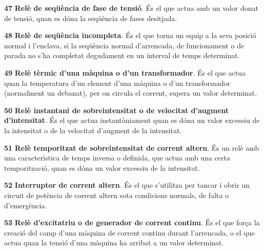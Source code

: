\begin{multicols}{2}
\begin{list}{}
\item[\textbf{47}]  \textbf{Rel\`{e}
de seq\"{u}\`{e}ncia de fase de tensi\'{o}}. \'{E}s el que actua amb un valor donat
de tensi\'{o}, quan es d\'{o}na la seq\"{u}\`{e}ncia de fases desitjada.

\item[\textbf{48}]  \textbf{Rel\`{e} de seq\"{u}\`{e}ncia
incompleta}. \'{E}s el que torna un equip a la seva posici\'{o} normal  i
l'enclava, si la seq\"{u}\`{e}ncia normal d'arrencada, de funcionament o de
parada no s'ha completat degudament en un interval de temps
determinat.

\item[\textbf{49}] 
\textbf{Rel\`{e} t\`{e}rmic d'una m\`{a}quina o d'un transformador}. \'{E}s el que
actua quan la temperatura d'un element d'una m\`{a}quina o d'un
transformador (normalment un debanat), per on circula el corrent,
supera un valor determinat.

\item[\textbf{50}]  \textbf{Rel\`{e} instantani de sobreintensitat o de velocitat d'augment
d'intensitat}. \'{E}s el que actua instant\`{a}niament quan es d\'{o}na un valor excessiu de la
intensitat o de la  velocitat d'augment de la intensitat.

\item[\textbf{51}] 
\textbf{Rel\`{e} temporitzat de sobreintensitat de corrent altern}. \'{E}s
un rel\`{e} amb una caracter\'{\i}stica de temps inversa o definida, que
actua amb una certa temporitzaci\'{o}, quan es d\'{o}na un valor excessiu de
la intensitat.

\item[\textbf{52}]  \textbf{Interruptor de corrent altern}. \'{E}s
 el que s'utilitza per tancar i obrir un circuit de pot\`{e}ncia de corrent altern sota condicions
normals, de falta o d'emerg\`{e}ncia.

\item[\textbf{53}] 
\textbf{Rel\`{e} d'excitatriu o de generador de corrent continu}. \'{E}s el
que for\c{c}a la creaci\'{o} del camp d'una m\`{a}quina de corrent continu
durant l'arrencada, o el que actua quan la tensi\'{o} d'una m\`{a}quina ha
arribat a un valor determinat.


\end{list}
\end{multicols}

